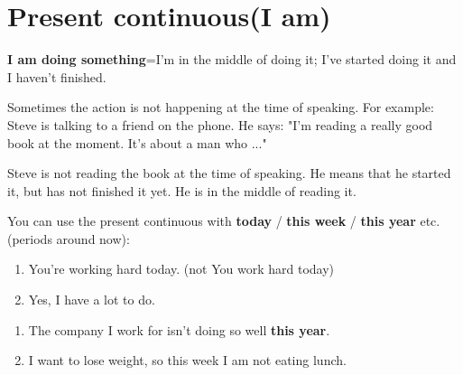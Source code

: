 \documentclass[12pt]{article}
\begin{document}
    \section{Present continuous(I am)}
    \textbf{I am doing something}=I'm in the middle of doing it; I've started doing it and I haven't
    finished. 

    Sometimes the action is not happening at the time of speaking. For example: \\
    Steve is talking to a friend on the phone. He says: "I'm reading a really good book at the moment.
    It's about a man who ..."

    Steve is not reading the book at the time of speaking. He means that he started it, but has not finished it yet.
    He is in the middle of reading it.

    You can use the present continuous with \textbf{today} / \textbf{this week} / \textbf{this year} etc. (periods around now):
    \begin{enumerate}[label=\Alph*:]
        \item You're working hard today. (not You work hard today)
        \item Yes, I have a lot to do.
    \end{enumerate}

    \begin{enumerate}[label=(\Alph*):]
        \item The company I work for isn't doing so well \textbf{this year}.
        \item I want to lose weight, so this week I am not eating lunch.
    \end{enumerate}
\end{document}
